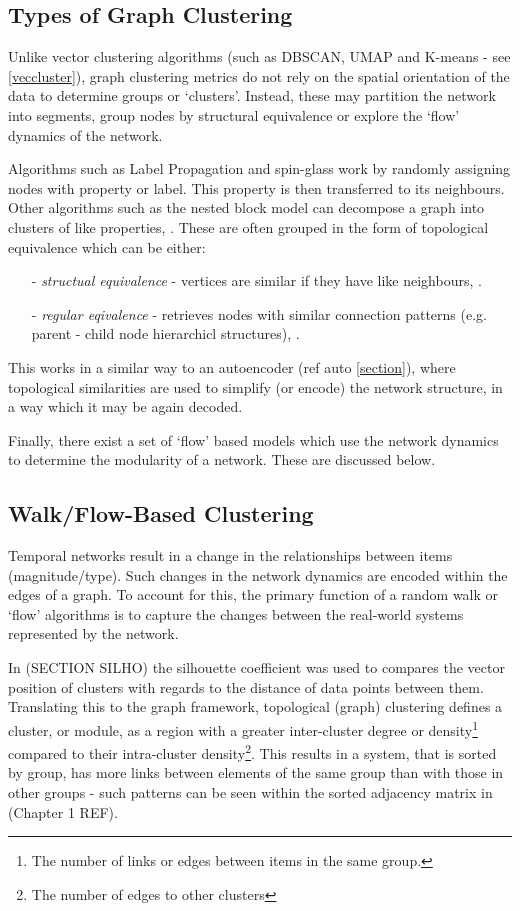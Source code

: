  \subsection{Types of Graph Clustering}
Unlike vector clustering algorithms (such as DBSCAN, UMAP and K-means - see \autoref{veccluster}), graph clustering metrics do not rely on the spatial orientation of the data to determine groups or `clusters'. Instead, these may partition the network into segments, group nodes by structural equivalence or explore the `flow' dynamics of the network.

Algorithms such as Label Propagation \citep{labelprop} and spin-glass \citep{spinglass} work by randomly assigning nodes with property or label. This property is then transferred to its neighbours. Other algorithms such as the nested block model can decompose a graph into clusters of like properties, \citep{communitygraph}. These are often grouped in the form of topological equivalence which can be either:
\begin{itemize}
    \item[-]\textit{structual equivalence} - vertices are similar if they have like neighbours, \citep{strueq}.
    \item[-]\textit{regular eqivalence} - retrieves nodes with similar connection patterns (e.g. parent - child node hierarchicl structures), \citep{regequiv}.
\end{itemize}
This works in a similar way to an autoencoder (ref auto \autoref{section}), where topological similarities are used to simplify (or encode) the network structure, in a way which it may be again decoded.

Finally, there exist a set of `flow' based models which use the network dynamics to determine the modularity of a network. These are discussed below.

\subsection{Walk/Flow-Based Clustering}
Temporal networks result in a change in the relationships between items (magnitude/type). Such changes in the network dynamics are encoded within the edges of a graph. To account for this, the primary function of a random walk or `flow' algorithms is to capture the changes between the real-world systems represented by the network.

In (SECTION SILHO) the silhouette coefficient was used to compares the vector position of clusters with regards to the distance of data points between them. Translating this to the graph framework, topological (graph) clustering defines a cluster, or module, as a region with a greater inter-cluster degree or density\footnote{The number of links or edges between items in the same group.} compared to their intra-cluster density\footnote{The number of edges to other clusters}. This results in a system, that is sorted by group, has more links between elements of the same group than with those in other groups - such patterns can be seen within the sorted adjacency matrix in (Chapter 1 REF).

